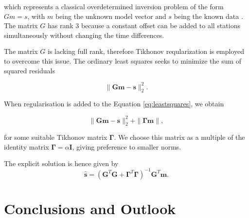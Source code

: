\documentclass[12pt,a4paper,english]{article}
\begin{document}
which represents a classical overdetermined inversion problem of the form $Gm = s$, with $m$ being the unknown model vector and $s$ being the known data \cite{sens2008}. The matrix $G$ has rank 3 because a constant offset can be added to all stations simultaneously without changing the time differences. 

The matrix $G$ is lacking full rank, therefore Tikhonov reqularization is employed to overcome this issue. The ordinary least squares seeks to minimize the sum of squared residuals

\begin{equation}
\| \mathbf{Gm}-\mathbf{s} \|_2^2.
\label{eq:leastsquares}
\end{equation}

When regularisation is added to the Equation \ref{eq:leastsquares}, we obtain

\begin{equation}
\| \mathbf{Gm}-\mathbf{s} \|_2^2 + \| \bm{\Gamma}\mathbf{m} \|, 
\label{eq:tikhonov}
\end{equation}

for some suitable Tikhonov matrix $\bm{\Gamma}$. We choose this matrix as a multiple of the identity matrix $\bm{\Gamma} = \alpha\mathbf{I}$, giving preference to smaller norms. 

The explicit solution is hence given by 
\begin{equation}
\hat{\mathbf{s}} = (\mathbf{G}^T\mathbf{G} + \bm{\Gamma}^T\bm{\Gamma})^{-1}\mathbf{G}^T\mathbf{m}.  
\end{equation}

\section{Conclusions and Outlook}


  
   
\end{document}
